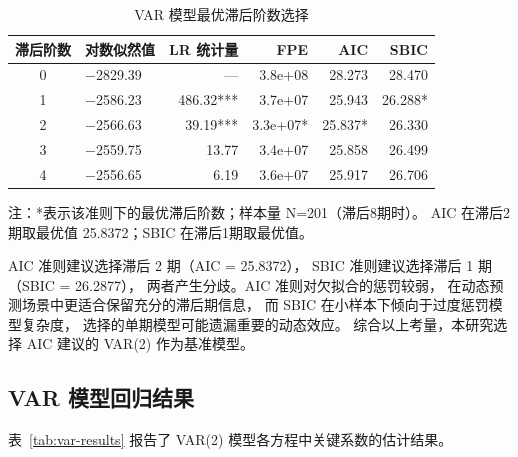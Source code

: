 \documentclass[
    type = master, %
    degree = professional,        %
    decl-page,  %
    twoside,                %
    fontset = fandol %
  ]{njuthesis}
\renewcommand{\footnotesize}{\zihao{-5}}
\begin{document}
\begin{table}[htbp]
    \centering
    \small
    \caption{VAR 模型最优滞后阶数选择}
    \label{tab:lag-selection}
    \begin{tabularx}{\textwidth}{cXrrrr}
        \toprule
        滞后阶数 & 对数似然值 & LR 统计量 & FPE & AIC & SBIC \\
        \midrule
        0 & $-$2829.39 & --- & 3.8e+08 & 28.273 & 28.470 \\
        1 & $-$2586.23 & 486.32*** & 3.7e+07 & 25.943 & 26.288* \\
        2 & $-$2566.63 & 39.19*** & 3.3e+07* & 25.837* & 26.330 \\
        3 & $-$2559.75 & 13.77 & 3.4e+07 & 25.858 & 26.499 \\
        4 & $-$2556.65 & 6.19 & 3.6e+07 & 25.917 & 26.706 \\
        \bottomrule
    \end{tabularx}
    \begin{minipage}{\textwidth}
        \vspace{0.3em}
        \footnotesize 注：*表示该准则下的最优滞后阶数；样本量 N=201（滞后8期时）。
              AIC 在滞后2期取最优值 25.8372；SBIC 在滞后1期取最优值。
    \end{minipage}
\end{table}

AIC 准则建议选择滞后 2 期（AIC = 25.8372），
SBIC 准则建议选择滞后 1 期（SBIC = 26.2877），
两者产生分歧。AIC 准则对欠拟合的惩罚较弱，
在动态预测场景中更适合保留充分的滞后期信息，
而 SBIC 在小样本下倾向于过度惩罚模型复杂度，
选择的单期模型可能遗漏重要的动态效应。
综合以上考量，本研究选择 AIC 建议的 VAR(2) 作为基准模型。

\subsection{VAR 模型回归结果}

表~\ref{tab:var-results} 报告了 VAR(2) 模型各方程中关键系数的估计结果。
\end{document}
